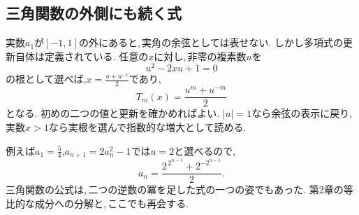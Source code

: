\subsection{三角関数の外側にも続く式}

実数$a_1$が$[-1,1]$の外にあると,\,実角の余弦としては表せない.
しかし多項式の更新自体は定義されている.
任意の$x$に対し,\,非零の複素数$u$を
\[
 u^2-2xu+1=0
\]
の根として選べば,$x=\frac{u+u^{-1}}2$であり,
\[
 T_m(x)=\frac{u^m+u^{-m}}2
\]
となる. 初めの二つの値と更新を確かめればよい.
$|u|=1$なら余弦の表示に戻り,\,実数$x>1$なら実根を選んで指数的な増大として読める.

例えば$a_1=\frac54$,$a_{n+1}=2a_n^2-1$では$u=2$と選べるので,
\[
 a_n=\frac{2^{\,2^{n-1}}+2^{-2^{n-1}}}{2}.
\]
三角関数の公式は,\,二つの逆数の冪を足した式の一つの姿でもあった.
第2章の等比的な成分への分解と,\,ここでも再会する.
